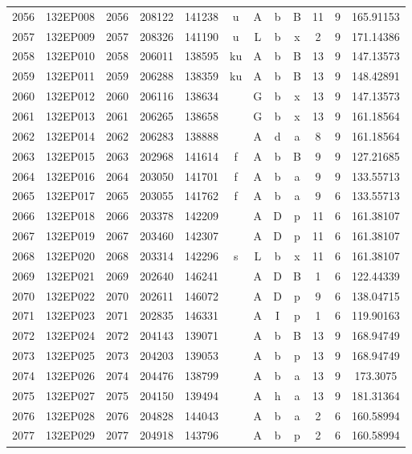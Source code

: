 \begin{tabular}{|*{12}{c|}}
2056 & 132EP008 & 2056 & 208122 & 141238 & u & A & b & B & 11 & 9 & 165.91153 \\ 
2057 & 132EP009 & 2057 & 208326 & 141190 & u & L & b & x & 2 & 9 & 171.14386 \\ 
2058 & 132EP010 & 2058 & 206011 & 138595 & ku & A & b & B & 13 & 9 & 147.13573 \\ 
2059 & 132EP011 & 2059 & 206288 & 138359 & ku & A & b & B & 13 & 9 & 148.42891 \\ 
2060 & 132EP012 & 2060 & 206116 & 138634 &  & G & b & x & 13 & 9 & 147.13573 \\ 
2061 & 132EP013 & 2061 & 206265 & 138658 &  & G & b & x & 13 & 9 & 161.18564 \\ 
2062 & 132EP014 & 2062 & 206283 & 138888 &  & A & d & a & 8 & 9 & 161.18564 \\ 
2063 & 132EP015 & 2063 & 202968 & 141614 & f & A & b & B & 9 & 9 & 127.21685 \\ 
2064 & 132EP016 & 2064 & 203050 & 141701 & f & A & b & a & 9 & 9 & 133.55713 \\ 
2065 & 132EP017 & 2065 & 203055 & 141762 & f & A & b & a & 9 & 6 & 133.55713 \\ 
2066 & 132EP018 & 2066 & 203378 & 142209 &  & A & D & p & 11 & 6 & 161.38107 \\ 
2067 & 132EP019 & 2067 & 203460 & 142307 &  & A & D & p & 11 & 6 & 161.38107 \\ 
2068 & 132EP020 & 2068 & 203314 & 142296 & s & L & b & x & 11 & 6 & 161.38107 \\ 
2069 & 132EP021 & 2069 & 202640 & 146241 &  & A & D & B & 1 & 6 & 122.44339 \\ 
2070 & 132EP022 & 2070 & 202611 & 146072 &  & A & D & p & 9 & 6 & 138.04715 \\ 
2071 & 132EP023 & 2071 & 202835 & 146331 &  & A & I & p & 1 & 6 & 119.90163 \\ 
2072 & 132EP024 & 2072 & 204143 & 139071 &  & A & b & B & 13 & 9 & 168.94749 \\ 
2073 & 132EP025 & 2073 & 204203 & 139053 &  & A & b & p & 13 & 9 & 168.94749 \\ 
2074 & 132EP026 & 2074 & 204476 & 138799 &  & A & b & a & 13 & 9 & 173.3075 \\ 
2075 & 132EP027 & 2075 & 204150 & 139494 &  & A & h & a & 13 & 9 & 181.31364 \\ 
2076 & 132EP028 & 2076 & 204828 & 144043 &  & A & b & a & 2 & 6 & 160.58994 \\ 
2077 & 132EP029 & 2077 & 204918 & 143796 &  & A & b & p & 2 & 6 & 160.58994 \\ 

\end{tabular}
